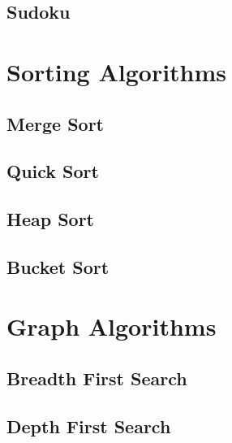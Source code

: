 \documentclass[10pt,a4paper]{article}
\begin{document}
\begin{landscape}
\begin{multicols}{2}


\subsection{Sudoku}



\section{Sorting Algorithms}

\subsection{Merge Sort}



\subsection{Quick Sort}



\subsection{Heap Sort}



\subsection{Bucket Sort}



\section{Graph Algorithms}

\subsection{Breadth First Search}



\subsection{Depth First Search}


\end{multicols}
\end{landscape}
\end{document}
